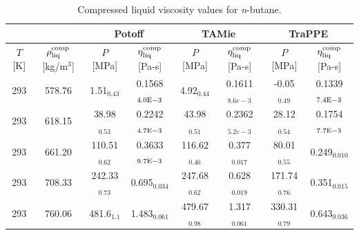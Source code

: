 \documentclass[preprint,review,12pt]{elsarticle}
\begin{document}
	\begin{table}[H]
		\caption{Compressed liquid viscosity values for \textit{n}-butane.}
		\begin{center}
			\begin{tabular}{|c|c|c|c|c|c|c|c|}
				\hline
				&                  & \multicolumn{2}{c|}{Potoff}     & \multicolumn{2}{c|}{TAMie}      & \multicolumn{2}{c|}{TraPPE}    \\ \hline
				$T$ {[}K{]} & $\rho^{\rm comp}_{\rm liq}$ {[}kg/m$^3${]} & $P$ {[}MPa{]}    & $\eta^{\rm comp}_{\rm liq}$ {[}Pa-s{]} & $P$ {[}MPa{]}    & $\eta^{\rm comp}_{\rm liq}$ {[}Pa-s{]} & $P$ {[}MPa{]}   & $\eta^{\rm comp}_{\rm liq}$ {[}Pa-s{]} \\ \hline
				293         & 578.76                                     & 1.51$_{0.43}$    & 0.1568$_{4.0 \rm E-3}$                      & 4.92$_{0.44}$    &	0.1611$_{8.6e-3}$                       & -0.05$_{0.49}$  & 0.1339$_{7.4 \rm E-3}$                      \\ \hline
				293         & 618.15                                     & 38.98$_{0.53}$   & 0.2242$_{4.7 \rm E-3}$                      & 43.98$_{0.51}$	 &  0.2362$_{5.2e-3}$                      & 28.12$_{0.54}$  & 0.1754$_{7.7 \rm E-3}$                      \\ \hline
				293         & 661.20                                     & 110.51$_{0.62}$  & 0.3633$_{9.7 \rm E-3}$                      & 116.62$_{0.46}$	 &  0.377$_{0.017}$                        & 80.01$_{0.55}$  & 0.249$_{0.010}$                        \\ \hline
				293         & 708.33                                     & 242.33$_{0.73}$  & 0.695$_{0.034}$                        & 247.68$_{0.62}$	     &  0.628$_{0.019}$                        & 171.74$_{0.76}$ & 0.351$_{0.015}$                        \\ \hline
				293         & 760.06                                     & 481.6$_{1.1}$    & 1.483$_{0.061}$                        & 479.67$_{0.98}$	     &  1.317$_{0.061}$                        & 330.31$_{0.79}$ & 0.643$_{0.036}$                        \\ \hline
			\end{tabular}
		\end{center}
	\end{table}
\end{document}
